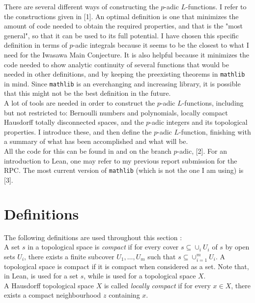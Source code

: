 \documentclass[11pt]{article}
\begin{document}
There are several different ways of constructing the $p$-adic $L$-functions. I refer to the constructions
given in [1]. An optimal definition is one that minimizes the amount of code needed to obtain the required properties, and that is the
"most general", so that it can be used to its full potential. I have chosen this specific definition in terms of $p$-adic integrals because it seems to be the
closest to what I need for the Iwasawa Main Conjecture. It is also helpful because it minimizes the
code needed to show analytic continuity of several functions that would be needed in other definitions,
and by keeping the preexisting theorems in \texttt{mathlib} in mind. Since \texttt{mathlib}
is an everchanging and increasing library, it is possible that this might not be the best definition
in the future. \\

A lot of tools are needed in order to construct the $p$-adic $L$-functions, including but not
restricted to: Bernoulli numbers and polynomials, locally compact Hausdorff totally
disconnected spaces, and the $p$-adic integers and its topological properties.
I introduce these, and then define the $p$-adic $L$-function, finishing with a summary of what has been
accomplished and what will be. \\

All the code for this can be found in  and
 on the branch $p$-adic, [2]. For an introduction to
Lean, one may refer to my previous report submission for the RPC. The most current version of \texttt{mathlib}
(which is not the one I am using) is [3].


\section{Definitions}
The following definitions are used throughout this section : \\

A set $s$ in a topological space is \textit{compact} if for every cover $s \subseteq \cup_{i} U_i$
of $s$ by open sets $U_i$, there exists a finite subcover $U_1, \dots, U_m$ such that
$s \subseteq \cup_{i = 1}^m U_i$. A topological space is compact if it is compact when considered
as a set. Note that, in Lean,  is used for a set $s$, while
 is used for a topological space $X$. \\

A Hausdorff topological space $X$ is called \textit{locally compact} if for every $x \in X$, there
exists a compact neighbourhood $z$ containing $x$. \\
\end{document}
